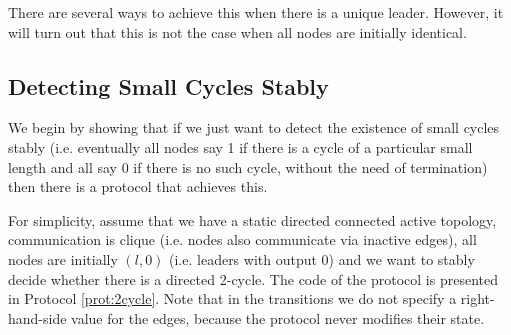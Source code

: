 \documentclass[preprint]{elsarticle}
\begin{document}
There are several ways to achieve this when there is a unique leader.
However, it will turn out that this is not the case when all nodes are initially
identical.

\subsection{Detecting Small Cycles Stably}

We begin by showing that if we just want to detect the existence of
small cycles stably (i.e. eventually all nodes say 1 if there is a cycle of a particular small length and all say 0
if there is no such cycle, without the need of termination) then there is a protocol that achieves this.

For simplicity, assume that we have a static directed connected active topology,
communication is clique (i.e. nodes also communicate via inactive edges),
all nodes are initially $(l,0)$ (i.e. leaders with output 0) and we want to
stably decide whether there is a directed 2-cycle. The code of the protocol is presented in Protocol \ref{prot:2cycle}. Note that in the transitions we do not specify a right-hand-side value for the edges, because the protocol never modifies their state.
\end{document}

